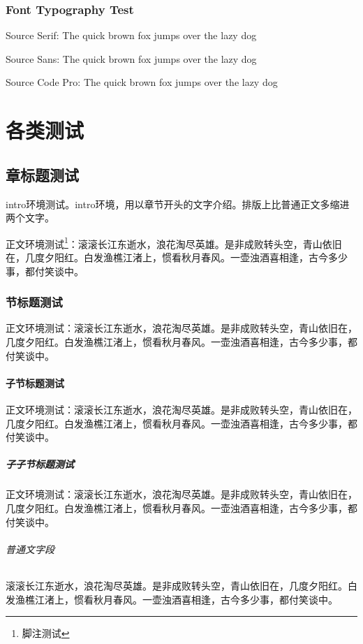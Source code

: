 \documentclass{../../PublicResources/DocClassLight}
\begin{document}
    \section{Font Typography Test}
    {Source Serif: The quick brown fox jumps over the lazy dog}

    {\sffamily Source Sans: The quick brown fox jumps over the lazy dog}

    {\ttfamily Source Code Pro: The quick brown fox jumps over the lazy dog}

    \part{各类测试}
    \chapter{章标题测试}

    \begin{intro}
        intro环境测试。intro环境，用以章节开头的文字介绍。排版上比普通正文多缩进两个文字。
    \end{intro}

    正文环境测试\footnote{脚注测试}：滚滚长江东逝水，浪花淘尽英雄。是非成败转头空，青山依旧在，几度夕阳红。白发渔樵江渚上，惯看秋月春风。一壶浊酒喜相逢，古今多少事，都付笑谈中。

    \section{节标题测试}
    正文环境测试：滚滚长江东逝水，浪花淘尽英雄。是非成败转头空，青山依旧在，几度夕阳红。白发渔樵江渚上，惯看秋月春风。一壶浊酒喜相逢，古今多少事，都付笑谈中。

    \subsection{子节标题测试}
    正文环境测试：滚滚长江东逝水，浪花淘尽英雄。是非成败转头空，青山依旧在，几度夕阳红。白发渔樵江渚上，惯看秋月春风。一壶浊酒喜相逢，古今多少事，都付笑谈中。

    \subsubsection{子子节标题测试}
    正文环境测试：滚滚长江东逝水，浪花淘尽英雄。是非成败转头空，青山依旧在，几度夕阳红。白发渔樵江渚上，惯看秋月春风。一壶浊酒喜相逢，古今多少事，都付笑谈中。

    \paragraph{普通文字段} 滚滚长江东逝水，浪花淘尽英雄。是非成败转头空，青山依旧在，几度夕阳红。白发渔樵江渚上，惯看秋月春风。一壶浊酒喜相逢，古今多少事，都付笑谈中。
\end{document}
